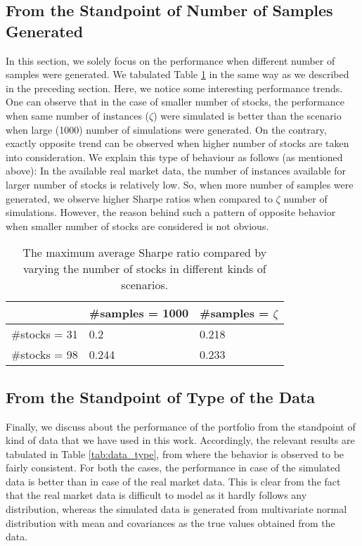 \subsection{From the Standpoint of Number of Samples Generated}
In this section, we solely focus on the performance when different number of samples were generated. We tabulated Table \ref{tab:no_samples} in the same way as we described in the preceding section. Here, we notice some interesting performance trends. One can observe that in the case of smaller number of stocks, the performance when same number of instances ($\zeta$) were simulated is better than the scenario when large (1000) number of simulations were generated. On the contrary, exactly opposite trend can be observed when higher number of stocks are taken into consideration. We explain this type of behaviour as follows (as mentioned above): In the available real market data, the number of instances available for larger number of stocks is relatively low. So, when more number of samples were generated, we observe higher Sharpe ratios when compared to $\zeta$ number of simulations. However, the reason behind such a pattern of opposite behavior when smaller number of stocks are considered is not obvious.
\begin{table}[!h]
    \centering
    \captionsetup{justification=centering}
   \begin{tabular}{||p{4cm}|p{4cm}|p{4cm}||}
   \hline
  & \#samples = 1000 & \#samples = $\zeta$ \\
  \hline
  \#stocks = 31  & 0.2    &0.218\\
 \#stocks = 98 &   0.244  & 0.233 \\
 \hline
\end{tabular}
    \caption{The maximum average Sharpe ratio compared by varying the number of stocks in different kinds of scenarios.}
    \label{tab:no_samples}
\end{table}

\subsection{From the Standpoint of Type of the Data}
Finally, we discuss about the performance of the portfolio from the standpoint of kind of data that we have used in this work. Accordingly, the relevant results are tabulated in Table \ref{tab:data_type}, from where the behavior is observed to be fairly consistent. For both the cases, the performance in case of the simulated data is better than in case of the real market data. This is clear from the fact that the real market data is difficult to model as it hardly follows any distribution, whereas the simulated data is generated from multivariate normal distribution with mean and covariances as the true values obtained from the data.

